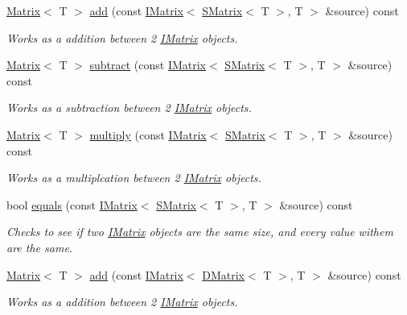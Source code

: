 \begin{DoxyCompactItemize}
\mbox{\hyperlink{class_matrix}{Matrix}}$<$ T $>$ \mbox{\hyperlink{class_t_matrix_a0be28ad9f704a789707cb1240eda9263}{add}} (const \mbox{\hyperlink{class_i_matrix}{I\+Matrix}}$<$ \mbox{\hyperlink{class_s_matrix}{S\+Matrix}}$<$ T $>$, T $>$ \&source) const
\begin{DoxyCompactList}\small\item\em Works as a addition between 2 \mbox{\hyperlink{class_i_matrix}{I\+Matrix}} objects. \end{DoxyCompactList}\item 
\mbox{\hyperlink{class_matrix}{Matrix}}$<$ T $>$ \mbox{\hyperlink{class_t_matrix_a85ba2381683bdb64de89e79f05b77ff4}{subtract}} (const \mbox{\hyperlink{class_i_matrix}{I\+Matrix}}$<$ \mbox{\hyperlink{class_s_matrix}{S\+Matrix}}$<$ T $>$, T $>$ \&source) const
\begin{DoxyCompactList}\small\item\em Works as a subtraction between 2 \mbox{\hyperlink{class_i_matrix}{I\+Matrix}} objects. \end{DoxyCompactList}\item 
\mbox{\hyperlink{class_matrix}{Matrix}}$<$ T $>$ \mbox{\hyperlink{class_t_matrix_a2d660bacd273f355571b06188f4a87d6}{multiply}} (const \mbox{\hyperlink{class_i_matrix}{I\+Matrix}}$<$ \mbox{\hyperlink{class_s_matrix}{S\+Matrix}}$<$ T $>$, T $>$ \&source) const
\begin{DoxyCompactList}\small\item\em Works as a multiplcation between 2 \mbox{\hyperlink{class_i_matrix}{I\+Matrix}} objects. \end{DoxyCompactList}\item 
bool \mbox{\hyperlink{class_t_matrix_ae37de1485648f8d68e57503d9c3996ed}{equals}} (const \mbox{\hyperlink{class_i_matrix}{I\+Matrix}}$<$ \mbox{\hyperlink{class_s_matrix}{S\+Matrix}}$<$ T $>$, T $>$ \&source) const
\begin{DoxyCompactList}\small\item\em Checks to see if two \mbox{\hyperlink{class_i_matrix}{I\+Matrix}} objects are the same size, and every value withem are the same. \end{DoxyCompactList}\item 
\mbox{\hyperlink{class_matrix}{Matrix}}$<$ T $>$ \mbox{\hyperlink{class_t_matrix_a7d1881d011aaafc2443c1dd7d6c07991}{add}} (const \mbox{\hyperlink{class_i_matrix}{I\+Matrix}}$<$ \mbox{\hyperlink{class_d_matrix}{D\+Matrix}}$<$ T $>$, T $>$ \&source) const
\begin{DoxyCompactList}\small\item\em Works as a addition between 2 \mbox{\hyperlink{class_i_matrix}{I\+Matrix}} objects. \end{DoxyCompactList}\item 

\end{DoxyCompactItemize}
